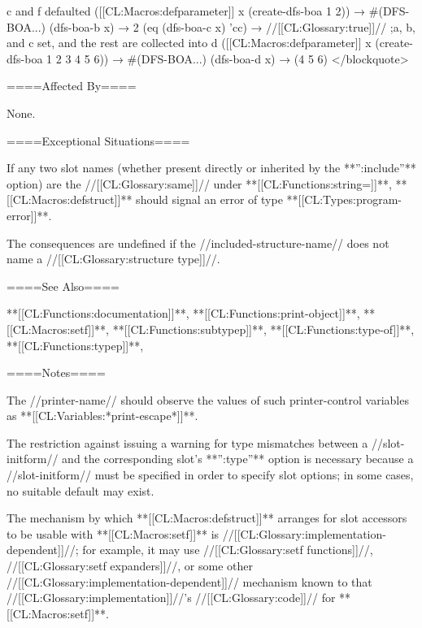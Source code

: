 c and f defaulted ([[CL:Macros:defparameter]] x (create-dfs-boa 1 2)) → #(DFS-BOA...) (dfs-boa-b x) → 2 (eq (dfs-boa-c x) 'cc) → //[[CL:Glossary:true]]// ;a, b, and c set, and the rest are collected into d ([[CL:Macros:defparameter]] x (create-dfs-boa 1 2 3 4 5 6)) → #(DFS-BOA...) (dfs-boa-d x) → (4 5 6) </blockquote>

====Affected By====

None.

====Exceptional Situations====

If any two slot names (whether present directly or inherited by the **'':include''** option) are the //[[CL:Glossary:same]]// under **[[CL:Functions:string=]]**, **[[CL:Macros:defstruct]]** should signal an error of type **[[CL:Types:program-error]]**.

The consequences are undefined if the //included-structure-name// does not name a //[[CL:Glossary:structure type]]//.

====See Also====

**[[CL:Functions:documentation]]**, **[[CL:Functions:print-object]]**, **[[CL:Macros:setf]]**, **[[CL:Functions:subtypep]]**, **[[CL:Functions:type-of]]**, **[[CL:Functions:typep]]**, {\secref\Compilation}

====Notes====


The //printer-name// should observe the values of such printer-control variables as **[[CL:Variables:*print-escape*]]**.

The restriction against issuing a warning for type mismatches between a //slot-initform// and the corresponding slot's **'':type''** option is necessary because a //slot-initform// must be specified in order to specify slot options; in some cases, no suitable default may exist.

The mechanism by which **[[CL:Macros:defstruct]]** arranges for slot accessors to be usable with **[[CL:Macros:setf]]** is //[[CL:Glossary:implementation-dependent]]//; for example, it may use //[[CL:Glossary:setf functions]]//, //[[CL:Glossary:setf expanders]]//, or some other //[[CL:Glossary:implementation-dependent]]// mechanism known to that //[[CL:Glossary:implementation]]//'s //[[CL:Glossary:code]]// for **[[CL:Macros:setf]]**.

